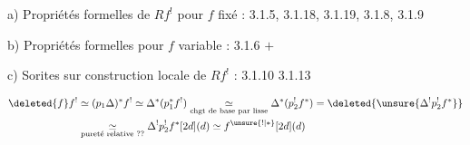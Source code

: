 a) Propriétés formelles de $Rf^!$ pour $f$ fixé :  3.1.5, 3.1.18, 3.1.19, 3.1.8, 3.1.9

b) Propriétés formelles pour $f$ variable : 3.1.6 $+$ 

c) Sorites sur construction locale de $Rf^!$ : 3.1.10  3.1.13

\[
 \begin{aligned}
 \deleted{f}f^!&\simeq(p_1\Delta)^*f^!\simeq\Delta^*(p_1^*f^!)
 \underset{\text{chgt de base par lisse}}{\simeq}\Delta^*(p_2^!f^*)=\deleted{\unsure{\Delta^!p_2^!f^*}}\\
 &\underset{\text{pureté relative ??}}{\simeq}\Delta^!p_2^!f^*[2d](d)\simeq f^{\unsure{!|*}}[2d](d)
 \end{aligned}
\]
